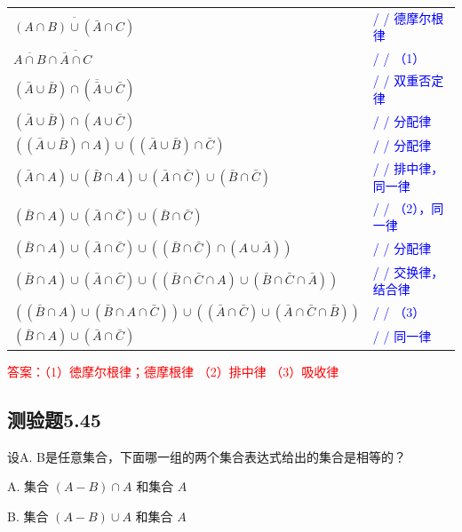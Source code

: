 \documentclass[UTF8, heading=true]{ctexart}
\begin{document}
\begin{table}[H]
  \centering
  \renewcommand{\arraystretch}{1.5}
\begin{tabular}{ll}
$\overline{(A \cap B) \cup(\bar{A} \cap C)}$ & \textcolor{blue}{/ / 德摩尔根律} \\
$\overline{A \cap B} \cap \overline{\bar{A} \cap C}$ & \textcolor{blue}{/ / （1）} \\
$(\bar{A} \cup \bar{B}) \cap(\overline{\bar{A}} \cup \bar{C})$ & \textcolor{blue}{/ / 双重否定律} \\
$(\bar{A} \cup \bar{B}) \cap(A \cup \bar{C})$ & \textcolor{blue}{/ / 分配律} \\
$((\bar{A} \cup \bar{B}) \cap A) \cup((\bar{A} \cup \bar{B}) \cap \bar{C})$ & \textcolor{blue}{/ / 分配律} \\
$(\bar{A} \cap A) \cup(\bar{B} \cap A) \cup(\bar{A} \cap \bar{C}) \cup(\bar{B} \cap \bar{C})$ & \textcolor{blue}{/ / 排中律，同一律} \\
$(\bar{B} \cap A) \cup(\bar{A} \cap \bar{C}) \cup(\bar{B} \cap \bar{C})$ & \textcolor{blue}{/ / （2），同一律} \\
$(\bar{B} \cap A) \cup(\bar{A} \cap \bar{C}) \cup((\bar{B} \cap \bar{C}) \cap(A \cup \bar{A}))$ & \textcolor{blue}{/ / 分配律} \\
$(\bar{B} \cap A) \cup(\bar{A} \cap \bar{C}) \cup((\bar{B} \cap \bar{C} \cap A) \cup(\bar{B} \cap \bar{C} \cap \bar{A}))$ & \textcolor{blue}{/ / 交换律，结合律} \\
$((\bar{B} \cap A) \cup(\bar{B} \cap A \cap \bar{C})) \cup((\bar{A} \cap \bar{C}) \cup(\bar{A} \cap \bar{C} \cap \bar{B}))$ & \textcolor{blue}{/ / （3）} \\
$(\bar{B} \cap A) \cup(\bar{A} \cap \bar{C})$ & \textcolor{blue}{/ / 同一律} \\
\end{tabular}
\end{table}



\textcolor{red}
{
  答案：（1）徳摩尔根律；德摩根律
  （2）排中律 
  （3）吸收律
}

\subsection{测验题5.45}

设A. B是任意集合，下面哪一组的两个集合表达式给出的集合是相等的？

A. 集合 $(A-B) \cap A$ 和集合 $A$

B. 集合 $(A-B) \cup A$ 和集合 $A$
\end{document}
